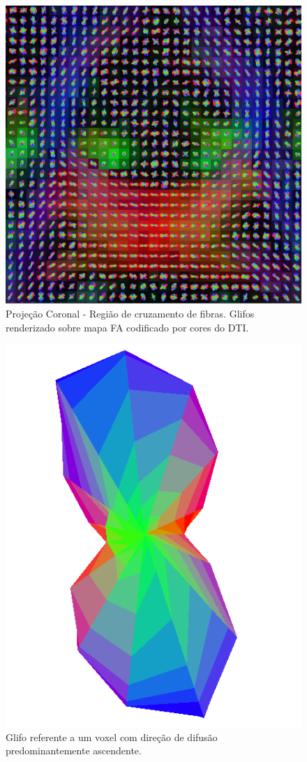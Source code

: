 \documentclass[
    12pt,                %
    oneside,            %
    a4paper,            %
    english,            %
    french,                %
    spanish,            %
    brazil                %
    ]{abntex2}
\begin{document}
\begin{figure}[H]
\label{fig::QBall_glifos_Coronal_CC_CS}
    \centering
    \includegraphics[width=.7\linewidth, angle=0]{figs/Exemplos_QBall_visualizacao/Coronal_Cruzamento_MapaFA.png}
    \caption{Projeção Coronal - Região de cruzamento de fibras. Glifos renderizado sobre mapa FA codificado por cores do DTI.}
\end{figure}

\begin{figure}[H]
\label{fig::QBall_glifos_azul}
    \centering

    \includegraphics[width=.4\linewidth, angle=0]{figs/Exemplos_QBall_visualizacao/Glifo_Azul.png}
    \caption{Glifo referente a um voxel com direção de difusão predominantemente ascendente.}
\end{figure}

\pagebreak
\end{document}
